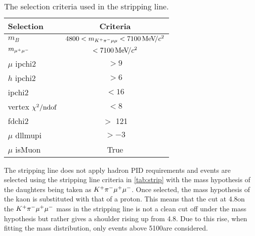 \begin{table}[h!]
      \centering
  \begin{tabular}{ l | c }
    \hline
    Selection & Criteria \\
    \hline
    $m_{B}$ & $4800 < m_{{{K}^+}{{\pi}^-}\mu\mu} < 7100{\mathrm{\,Me\kern -0.1em V\!/}c^2}$ \\
    $m_{{\mu^+}{\mu^-}}$ & $< 7100{\mathrm{\,Me\kern -0.1em V\!/}c^2}$ \\
    $\mu$ \gls{ipchi2}& $> 9$ \\
    $h$ \gls{ipchi2}& $> 6$ \\
    \B \gls{ipchi2} & $< 16$ \\
    \B vertex $\chi^2/{\mathrm {ndof}}$ & $< 8$ \\
    \B \gls{fdchi2}& $>$ 121\\
    $\mu$ \gls{dllmupi} & $> -3$ \\
    $\mu$ \gls{isMuon} & True \\
         
    \hline
  \end{tabular}
  \caption{The selection criteria used in the stripping line.}
  \label{tab:strip}
  \end{table}
  
The stripping line does not apply hadron PID requirements and events are selected using the stripping line criteria in \autoref{tab:strip} with the mass hypothesis of the daughters being taken as ${{K}^+}{{\pi}^-}{\mu^+\mu^-}$. Once selected, the mass hypothesis of the kaon is substituted with that of a proton. This means that the cut at 4.8\gevcc on the ${{K}^+}{{\pi}^-}{\mu^+\mu^-}$ mass in the stripping line is not a clean cut off under the \mumuppi mass hypothesis but rather gives a shoulder rising up from 4.8\gevcc. Due to this rise, when fitting the \Lb mass distribution, only events above 5100\mevcc are considered.


